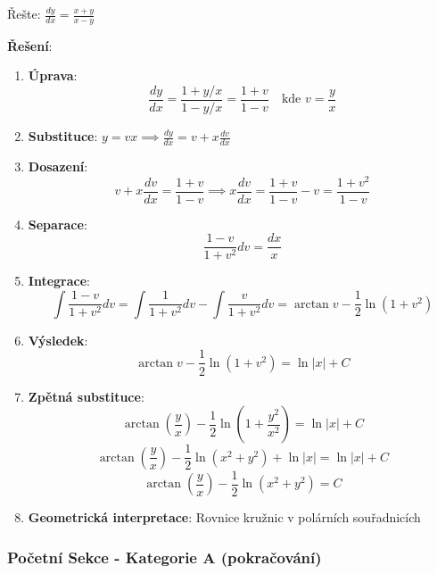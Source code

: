 \begin{example}
Řešte: $\frac{dy}{dx} = \frac{x + y}{x - y}$
\vspace{0.3\baselineskip}

\textbf{Řešení}: 
\begin{enumerate}
\item \textbf{Úprava}:
\[
\frac{dy}{dx} = \frac{1 + y/x}{1 - y/x} = \frac{1 + v}{1 - v} \quad \text{kde } v = \frac{y}{x}
\]

\item \textbf{Substituce}: $y = vx \implies \frac{dy}{dx} = v + x\frac{dv}{dx}$

\item \textbf{Dosazení}:
\[
v + x\frac{dv}{dx} = \frac{1 + v}{1 - v} \implies x\frac{dv}{dx} = \frac{1 + v}{1 - v} - v = \frac{1 + v^2}{1 - v}
\]

\item \textbf{Separace}:
\[
\frac{1 - v}{1 + v^2}dv = \frac{dx}{x}
\]

\item \textbf{Integrace}:
\[
\int \frac{1 - v}{1 + v^2}dv = \int \frac{1}{1 + v^2}dv - \int \frac{v}{1 + v^2}dv = \arctan v - \frac{1}{2}\ln(1 + v^2)
\]

\item \textbf{Výsledek}:
\[
\arctan v - \frac{1}{2}\ln(1 + v^2) = \ln|x| + C
\]

\item \textbf{Zpětná substituce}:
\[
\arctan\left(\frac{y}{x}\right) - \frac{1}{2}\ln\left(1 + \frac{y^2}{x^2}\right) = \ln|x| + C
\]
\[
\arctan\left(\frac{y}{x}\right) - \frac{1}{2}\ln(x^2 + y^2) + \ln|x| = \ln|x| + C
\]
\[
\arctan\left(\frac{y}{x}\right) - \frac{1}{2}\ln(x^2 + y^2) = C
\]

\item \textbf{Geometrická interpretace}: Rovnice kružnic v polárních souřadnicích
\end{enumerate}
\end{example}

\vspace{0.8\baselineskip}






\subsubsection{Početní Sekce - Kategorie A (pokračování)}
\label{subsubsec:pocetni-kategorie-a-fv-pokracovani}

